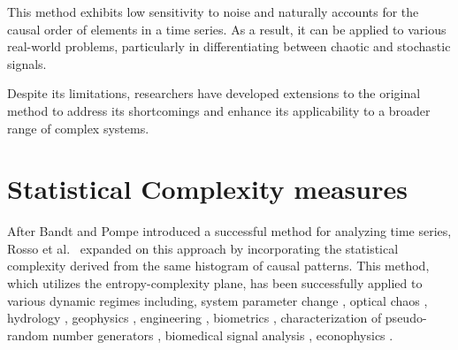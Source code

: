 This method exhibits low sensitivity to noise and naturally accounts for the causal order of elements in a time series. As a result, it can be applied to various real-world problems, particularly in differentiating between chaotic and stochastic signals.

Despite its limitations, researchers have developed extensions to the original method to address its shortcomings and enhance its applicability to a broader range of complex systems.

\section{Statistical Complexity measures} \label{Sec:BackgroundKnowledge}

After Bandt and Pompe introduced a successful method for analyzing time series, Rosso et al.~\cite{Rosso2007} expanded on this approach by incorporating the  statistical complexity derived from the same histogram of causal patterns. 
This method, which utilizes the entropy-complexity plane, has been successfully applied to various dynamic regimes including, 
system parameter change
\cite{Bandt2005,Cao2004,DeMicco2012a,Kowalski2007,Kowalski2011b,Rosso2010a,Zunino2010a,Zunino2012a}, 
optical chaos \cite{Liu2016f,Soriano2011a,Toomey2014,Yang2015e,Zunino2011a}, hydrology \cite{Lange2013,Serinaldi2014,Stosic2016}, geophysics \cite{Consolini2014,Saco2010,Sippel2016}, engineering \cite{Aquino2017,Aquino2015,Redelico2017a,Yan2012}, biometrics \cite{Rosso2016}, characterization of pseudo-random number generators \cite{DeMicco2008,DeMicco2009}, biomedical signal analysis \cite{Li2014b,Li2008b,Li2007,Liang2015b,Montani2015a,Montani2014,Montani2014a,Montani2015,Morabito2012,Parlitz2012,Zanin2012}, econophysics \cite{Bariviera2015a,Bariviera2015,Bariviera2016,Zanin2012,Zunino2016a,Zunino2009,Zunino2010}.

